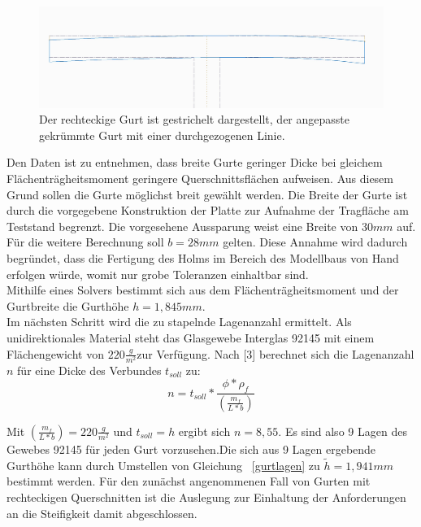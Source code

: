 \begin{figure}
	\includegraphics[width=1.0\textwidth]{Bilder/KrummerGurt.jpg}
	\caption{Der rechteckige Gurt ist gestrichelt dargestellt, der angepasste gekrümmte Gurt mit einer durchgezogenen Linie.}
	\label{fig: KrummerGurt}
\end{figure}


\noindent Den Daten ist zu entnehmen, dass breite Gurte geringer Dicke bei gleichem Flächenträgheitsmoment geringere Querschnittsflächen aufweisen. Aus diesem Grund sollen die Gurte möglichst breit gewählt werden. Die Breite der Gurte ist durch die vorgegebene Konstruktion der Platte zur Aufnahme der Tragfläche am Teststand begrenzt. Die vorgesehene Aussparung weist eine Breite von $ 30mm $ auf. Für die weitere Berechnung soll $ b=28mm $ gelten. Diese Annahme wird dadurch begründet, dass die Fertigung des Holms im Bereich des Modellbaus von Hand erfolgen würde, womit nur grobe Toleranzen einhaltbar sind.\\

\noindent Mithilfe eines Solvers bestimmt sich aus dem Flächenträgheitsmoment und der Gurtbreite die Gurthöhe $ h=1,845mm $.\\
\noindent Im nächsten Schritt wird die zu stapelnde Lagenanzahl ermittelt. Als unidirektionales Material steht das Glasgewebe Interglas 92145 mit einem Flächengewicht von $ 220\frac{g}{m^{2}} $zur Verfügung. Nach [3] berechnet sich die Lagenanzahl $ n $ für eine Dicke des Verbundes $ t_{soll} $ zu:\\

\begin{equation}
	\label{gurtlagen}
	n=t_{soll}*\frac{\phi*\rho_{f}}{\left(\frac{m_{f}}{L*b}\right)}
\end{equation}

\noindent Mit $ \left(\frac{m_{f}}{L*b}\right) = 220\frac{g}{m^{2}} $ und $ t_{soll}=h $ ergibt sich $ n=8,55 $. Es sind also 9 Lagen des Gewebes 92145 für jeden Gurt vorzusehen.Die sich aus 9 Lagen ergebende Gurthöhe kann durch Umstellen von Gleichung ~\ref{gurtlagen} zu $ \tilde{h}=1,941mm $ bestimmt werden. Für den zunächst angenommenen Fall von Gurten mit rechteckigen Querschnitten ist die Auslegung zur Einhaltung der Anforderungen an die Steifigkeit damit abgeschlossen.\\


